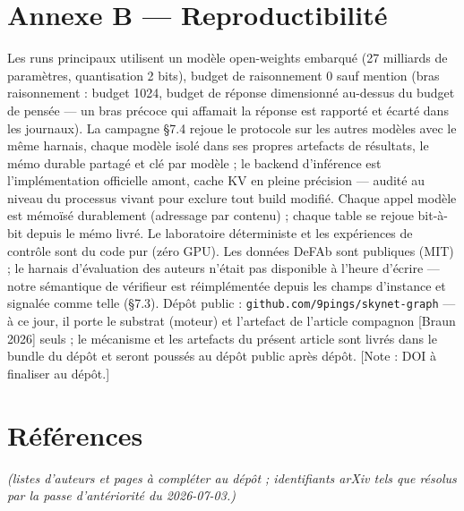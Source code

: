 \documentclass[11pt]{article}
\begin{document}
\section*{Annexe B — Reproductibilité}

Les runs principaux utilisent un modèle open-weights embarqué (27 milliards de paramètres, quantisation 2 bits), budget de raisonnement 0 sauf mention (bras raisonnement : budget 1024, budget de réponse dimensionné au-dessus du budget de pensée — un bras précoce qui affamait la réponse est rapporté et écarté dans les journaux). La campagne §7.4 rejoue le protocole sur les autres modèles avec le même harnais, chaque modèle isolé dans ses propres artefacts de résultats, le mémo durable partagé et clé par modèle ; le backend d'inférence est l'implémentation officielle amont, cache KV en pleine précision — audité au niveau du processus vivant pour exclure tout build modifié. Chaque appel modèle est mémoïsé durablement (adressage par contenu) ; chaque table se rejoue bit-à-bit depuis le mémo livré. Le laboratoire déterministe et les expériences de contrôle sont du code pur (zéro GPU). Les données DeFAb sont publiques (MIT) ; le harnais d'évaluation des auteurs n'était pas disponible à l'heure d'écrire — notre sémantique de vérifieur est réimplémentée depuis les champs d'instance et signalée comme telle (§7.3). Dépôt public : \texttt{github.com/\allowbreak{}9pings/\allowbreak{}skynet-graph} — à ce jour, il porte le substrat (moteur) et l'artefact de l'article compagnon [Braun 2026] seuls ; le mécanisme et les artefacts du présent article sont livrés dans le bundle du dépôt et seront poussés au dépôt public après dépôt. [Note : DOI à finaliser au dépôt.]

\section*{Références}

\emph{(listes d'auteurs et pages à compléter au dépôt ; identifiants arXiv tels que résolus par la passe d'antériorité du 2026-07-03.)}
\end{document}
